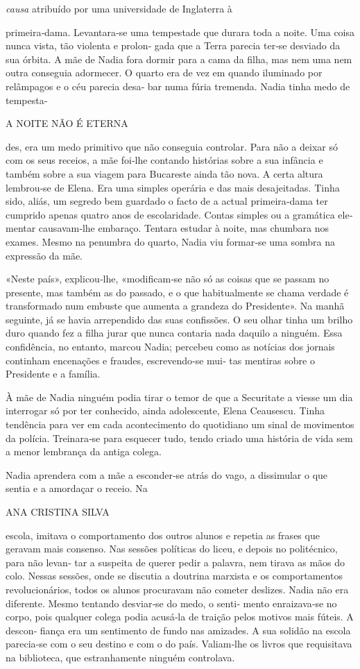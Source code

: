 \emph{causa }atribuído por uma universidade de Inglaterra à

primeira‑dama. Levantara‑se uma tempestade que durara toda a noite. Uma
coisa nunca vista, tão violenta e prolon‑ gada que a Terra parecia
ter‑se desviado da sua órbita. A mãe de Nadia fora dormir para a cama da
filha, mas nem uma nem outra conseguia adormecer. O quarto era de vez em
quando iluminado por relâmpagos e o céu parecia desa‑ bar numa fúria
tremenda. Nadia tinha medo de tempesta‑

A NOITE NÃO É ETERNA

des, era um medo primitivo que não conseguia controlar. Para não a
deixar só com os seus receios, a mãe foi‑lhe contando histórias sobre a
sua infância e também sobre a sua viagem para Bucareste ainda tão nova.
A certa altura lembrou‑se de Elena. Era uma simples operária e das mais
desajeitadas. Tinha sido, aliás, um segredo bem guardado o facto de a
actual primeira‑dama ter cumprido apenas quatro anos de escolaridade.
Contas simples ou a gramática ele‑ mentar causavam‑lhe embaraço. Tentara
estudar à noite, mas chumbara nos exames. Mesmo na penumbra do quarto,
Nadia viu formar‑se uma sombra na expressão da mãe.

«Neste país», explicou‑lhe, «modificam‑se não só as coisas que se passam
no presente, mas também as do passado, e o que habitualmente se chama
verdade é transformado num embuste que aumenta a grandeza do
Presidente». Na manhã seguinte, já se havia arrependido das suas
confissões. O seu olhar tinha um brilho duro quando fez a filha jurar
que nunca contaria nada daquilo a ninguém. Essa confidência, no entanto,
marcou Nadia; percebeu como as notícias dos jornais continham encenações
e fraudes, escrevendo‑se mui‑ tas mentiras sobre o Presidente e a
família.

À mãe de Nadia ninguém podia tirar o temor de que a Securitate a viesse
um dia interrogar só por ter conhecido, ainda adolescente, Elena
Ceausescu. Tinha tendência para ver em cada acontecimento do quotidiano
um sinal de movimentos da polícia. Treinara‑se para esquecer tudo, tendo
criado uma história de vida sem a menor lembrança da antiga colega.

Nadia aprendera com a mãe a esconder‑se atrás do vago, a dissimular o
que sentia e a amordaçar o receio. Na

ANA CRISTINA SILVA

escola, imitava o comportamento dos outros alunos e repetia as frases
que geravam mais consenso. Nas sessões políticas do liceu, e depois no
politécnico, para não levan‑ tar a suspeita de querer pedir a palavra,
nem tirava as mãos do colo. Nessas sessões, onde se discutia a doutrina
marxista e os comportamentos revolucionários, todos os alunos procuravam
não cometer deslizes. Nadia não era diferente. Mesmo tentando desviar‑se
do medo, o senti‑ mento enraizava‑se no corpo, pois qualquer colega
podia acusá‑la de traição pelos motivos mais fúteis. A descon‑ fiança
era um sentimento de fundo nas amizades. A sua solidão na escola
parecia‑se com o seu destino e com o do país. Valiam‑lhe os livros que
requisitava na biblioteca, que estranhamente ninguém controlava.

